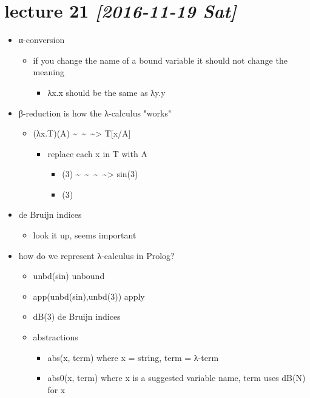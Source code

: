 \documentclass[11pt]{article}
\begin{document}
\section{lecture 21 \textit{[2016-11-19 Sat]}}
\label{sec-19}
\begin{itemize}
\item α-conversion
\begin{itemize}
\item if you change the name of a bound variable it should not change the meaning
\begin{itemize}
\item λx.x should be the same as λy.y
\end{itemize}
\end{itemize}
\item β-reduction is how the λ-calculus "works"
\begin{itemize}
\item (λx.T)(A) \textasciitilde{}~\textasciitilde{}~\textasciitilde{}> T[x/A]
\begin{itemize}
\item replace each x in T with A
\begin{itemize}
\item\relax [λx.sin(x)](3) \textasciitilde{}~\textasciitilde{}~\textasciitilde{}~\textasciitilde{}> sin(3)
\item\relax [λx.(sin(x) + (λx.x)(5))](3)
\end{itemize}
\end{itemize}
\end{itemize}
\item de Bruijn indices
\begin{itemize}
\item look it up, seems important
\end{itemize}
\item how do we represent λ-calculus in Prolog?
\begin{itemize}
\item unbd(sin) unbound
\item app(unbd(sin),unbd(3)) apply
\item dB(3) de Bruijn indices
\item abstractions
\begin{itemize}
\item abs(x, term) where x = string, term = λ-term
\item abs0(x, term) where x is a suggested variable name, term uses dB(N) for x
\end{itemize}
\end{itemize}

\end{itemize}
\end{document}
